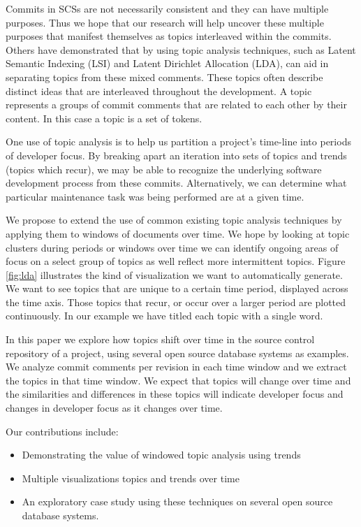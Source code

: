 \documentclass[times, 10pt,twocolumn]{article}
\begin{document}
Commits in SCSs are not necessarily consistent and they can have
multiple purposes. Thus we hope that our research will help uncover
these multiple purposes that manifest themselves as topics interleaved
within the commits.  Others have demonstrated that by using 
topic analysis techniques, such as Latent Semantic Indexing (LSI) and
Latent Dirichlet Allocation (LDA), can aid in separating topics from
these mixed comments. These topics often describe distinct ideas that
are interleaved throughout the development. A topic represents a
groups of commit comments that are related to each other by their
content.  In this case a topic is a set of tokens.



One use of topic analysis is to help us partition a project's
time-line into periods of developer focus. By breaking apart an
iteration into sets of topics and trends (topics which recur), we may
be able to recognize the underlying software development process from
these commits. Alternatively, we can determine what particular
maintenance task was being performed are at a given time.

We propose to extend the use of common existing topic analysis techniques by
applying them to windows of documents over time. We hope by looking
at topic clusters during periods or windows over time we can identify
ongoing areas of focus on a select group of topics as well reflect more intermittent topics. Figure \ref{fig:lda} illustrates
the kind of visualization we want to automatically generate. We want
to see topics that are unique to a certain time period, displayed
across the time axis. Those topics that recur, or occur over a
larger period are plotted continuously. In our example we have
titled each topic with a single word.

In this paper we explore how topics shift over time in the source
control repository of a project, using several open source database
systems as examples. We analyze commit comments per revision in each
time window and we extract the topics in that time window. We expect
that topics will change over time and the similarities
and differences in these topics will indicate developer
focus and changes in developer focus as it changes over time.

Our contributions include:
\begin{itemize}
\item Demonstrating the value of windowed topic analysis using trends
\item Multiple visualizations topics and trends over time
\item An exploratory case study using these techniques on several open source database systems.
\end{itemize}
\end{document}
